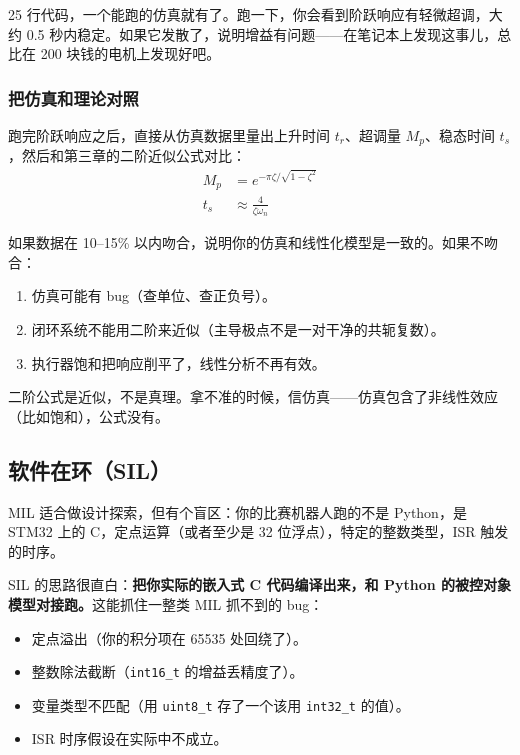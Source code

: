 25 行代码，一个能跑的仿真就有了。跑一下，你会看到阶跃响应有轻微超调，大约 0.5 秒内稳定。如果它发散了，说明增益有问题——在笔记本上发现这事儿，总比在 200 块钱的电机上发现好吧。

\subsubsection{把仿真和理论对照}

跑完阶跃响应之后，直接从仿真数据里量出上升时间 $t_r$、超调量 $M_p$、稳态时间 $t_s$，然后和第三章的二阶近似公式对比：
\begin{align}
M_p &= e^{-\pi\zeta / \sqrt{1 - \zeta^2}} \\
t_s &\approx \frac{4}{\zeta \omega_n}
\end{align}

如果数据在 10--15\% 以内吻合，说明你的仿真和线性化模型是一致的。如果不吻合：
\begin{enumerate}
    \item 仿真可能有 bug（查单位、查正负号）。
    \item 闭环系统不能用二阶来近似（主导极点不是一对干净的共轭复数）。
    \item 执行器饱和把响应削平了，线性分析不再有效。
\end{enumerate}

二阶公式是近似，不是真理。拿不准的时候，信仿真——仿真包含了非线性效应（比如饱和），公式没有。

\subsection{软件在环（SIL）}

MIL 适合做设计探索，但有个盲区：你的比赛机器人跑的不是 Python，是 STM32 上的 C，定点运算（或者至少是 32 位浮点），特定的整数类型，ISR 触发的时序。

SIL 的思路很直白：\textbf{把你实际的嵌入式 C 代码编译出来，和 Python 的被控对象模型对接跑。}这能抓住一整类 MIL 抓不到的 bug：
\begin{itemize}
    \item 定点溢出（你的积分项在 65535 处回绕了）。
    \item 整数除法截断（\texttt{int16\_t} 的增益丢精度了）。
    \item 变量类型不匹配（用 \texttt{uint8\_t} 存了一个该用 \texttt{int32\_t} 的值）。
    \item ISR 时序假设在实际中不成立。
\end{itemize}

